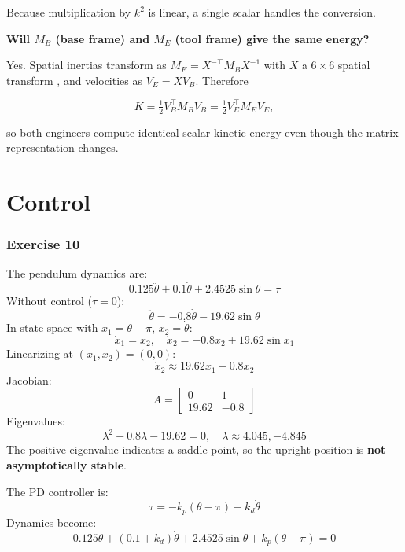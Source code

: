 \documentclass[12pt,a4paper]{article}
\begin{document}
Because multiplication by $k^{2}$ is linear, a single scalar handles the conversion.

\textbf{Will $M_B$ (base frame) and $M_E$ (tool frame) give the same energy?}

Yes.  Spatial inertias transform as  
\(M_E = X^{-\!\top} M_B X^{-1}\)
with $X$ a $6\times6$ spatial transform
\cite[Eq.\,(3.15)]{Featherstone2014}, and velocities as
\(V_E = X V_B\).  Therefore  

\[
K
  = \tfrac12 V_B^{\!\top} M_B V_B
  = \tfrac12 V_E^{\!\top} M_E V_E,
\]

so both engineers compute identical scalar kinetic energy even though the
matrix representation changes.



\section{Control}
\subsubsection*{Exercise 10}
The pendulum dynamics are:
\[
0.125 \ddot{\theta} + 0.1 \dot{\theta} + 2.4525 \sin \theta = \tau
\]
Without control (\(\tau = 0\)):
\[
\ddot{\theta} = -0.8 \dot{\theta} - 19.62 \sin \theta
\]
In state-space with \(x_1 = \theta - \pi\), \(x_2 = \dot{\theta}\):
\[
\dot{x}_1 = x_2, \quad \dot{x}_2 = -0.8 x_2 + 19.62 \sin x_1
\]
Linearizing at \((x_1, x_2) = (0, 0)\):
\[
\dot{x}_2 \approx 19.62 x_1 - 0.8 x_2
\]
Jacobian:
\[
A = \begin{bmatrix} 0 & 1 \\ 19.62 & -0.8 \end{bmatrix}
\]
Eigenvalues:
\[
\lambda^2 + 0.8 \lambda - 19.62 = 0, \quad \lambda \approx 4.045, -4.845
\]
The positive eigenvalue indicates a saddle point, so the upright position is \textbf{not asymptotically stable}.

The PD controller is:
\[
\tau = -k_p (\theta - \pi) - k_d \dot{\theta}
\]
Dynamics become:
\[
0.125 \ddot{\theta} + (0.1 + k_d) \dot{\theta} + 2.4525 \sin \theta + k_p (\theta - \pi) = 0
\]
\end{document}
